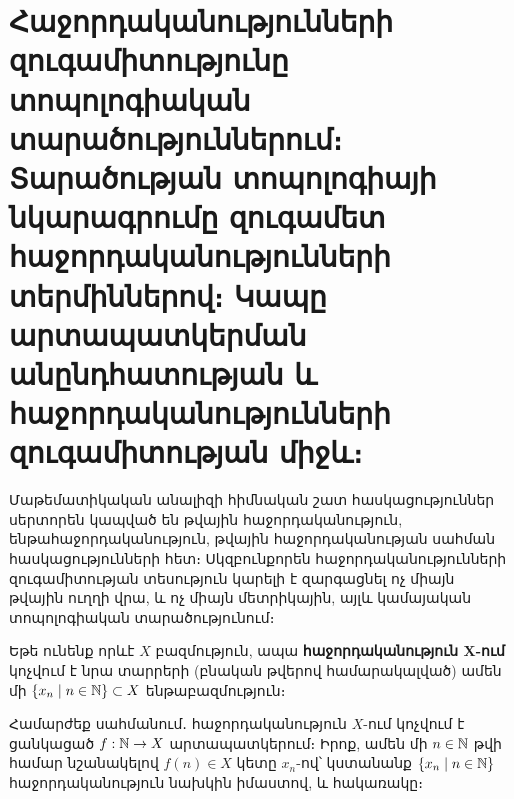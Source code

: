 \documentclass[./main.tex]{subfiles}
\begin{document}
\onehalfspacing
\section{Հաջորդականությունների զուգամիտությունը տոպոլոգիական տարա\-ծու\-թյուն\-նե\-րում։ Տարածության տոպոլոգիայի նկարագրումը զուգա\-մետ հաջոր\-դա\-կանությունների տերմիններով։ Կապը արտա\-պատ\-կեր\-ման անընդ\-հա\-տու\-թյան և հաջորդականությունների զուգա\-մի\-տու\-թյան միջև։}\label{sec:10}


\par Մաթեմատիկական անալիզի հիմնական շատ հասկացություններ սերտորեն \linebreak կապ\-ված են թվային հաջորդականություն, ենթահաջորդականություն, թվային հա\-ջոր\-դա\-կա\-նու\-թյան սահման հասկացությունների հետ։ Սկզբունքորեն հա\-ջոր\-դա\-կա\-նու\-թյունների զուգամիտության տեսություն կարելի է զարգացնել ոչ միայն թվա\-յին ուղղի վրա, և ոչ միայն մետրիկային, այլև կամայական տոպոլոգիական տարա\-ծու\-թյու\-նում։



\par Եթե ունենք որևէ $X$ բազմություն, ապա \textbf{հաջորդականություն $\boldsymbol{X}$-ում} կոչվում է նրա տարրերի (բնական թվերով համարակալված) ամեն մի $\{x_n \mid n \in \mathbb{N} \} \subset X$ ենթաբազ\-մու\-թյուն։

\par Համարժեք սահմանում․ հաջորդականություն $X$-ում կոչվում է ցանկացած \linebreak ${f:\mathbb{N}\rightarrow X}$ արտապատկերում։ Իրոք, ամեն մի ${n \in \mathbb{N}}$ թվի համար նշանակելով \linebreak ${f(n)\in X}$ կետը $x_n$-ով՝ կստանանք $\{x_n \mid n \in \mathbb{N}\}$ հաջորդականություն նախկին իմաստով, և հակառակը։
\end{document}
